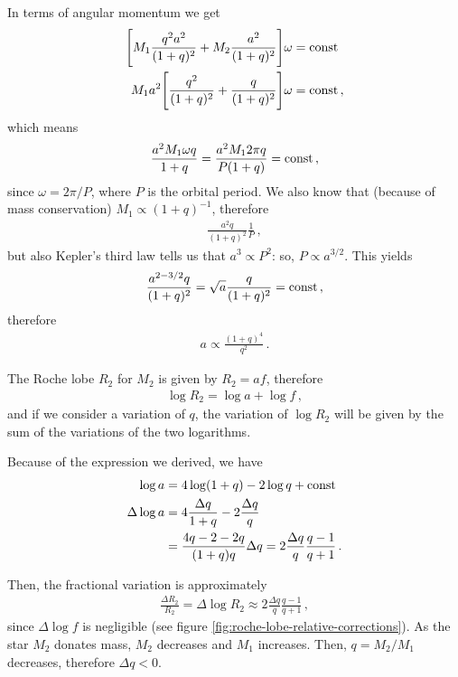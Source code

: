\documentclass[main.tex]{subfiles}
\begin{document}
In terms of angular momentum we get 
%
\begin{align}
\qty[
    M_1 \frac{q^2 a^2}{(1 + q)^2}
    + M_2 \frac{a^2}{(1+q)^2}
]\omega &= \text{const} \\
M_1 a^2
\qty[
    \frac{q^2}{(1 + q)^2}
    + \frac{q}{(1+q)^2}
]\omega &= \text{const} 
\,,
\end{align}
%
which means 
%
\begin{align}
\frac{a^2 M_1 \omega q}{1 + q} =
\frac{a^2 M_1 2 \pi  q}{P(1 + q)} 
= \text{const}
\,,
\end{align}
%
since \(\omega = 2\pi / P\), where \(P\) is the orbital period. 
We also know that (because of mass conservation) \(M_1 \propto (1 + q)^{-1}\), therefore 
%
\begin{align}
\frac{a^2 q}{(1+q)^2} \frac{1}{P}
\,,
\end{align}
%
but also Kepler's third law tells us that \(a^3 \propto P^2\): so, \(P \propto a^{3/2}\). This yields 
%
\begin{align}
\frac{a^{2 - 3/2} q}{(1+q)^2} = \sqrt{a} \frac{q}{(1+q)^2} = \text{const}
\,,
\end{align}
%
therefore 
%
\begin{align}
a \propto \frac{(1 + q)^{4}}{q^2}
\,.
\end{align}

The Roche lobe \(R_2\) for \(M_2\) is given by \(R_2 = a f\), therefore
%
\begin{align}
\log R_2 = \log a + \log f
\,,
\end{align}
%
and if we consider a variation of \(q\), the variation of \(\log R_2 \) will be given by the sum of the variations of the two logarithms. 

Because of the expression we derived, we have 
%
\begin{align}
\log a &= 4 \log (1 +q) - 2 \log q + \text{const} \\
\Delta \log a &= 4 \frac{\Delta q}{1 + q} - 2 \frac{\Delta q}{q }  \\
&= \frac{4q -2 -2 q}{(1 + q) q} \Delta q = 2 \frac{\Delta q}{q} \frac{q -1}{q +1}
\,.
\end{align}

Then, the fractional variation is approximately 
%
\begin{align}
\frac{\Delta R_2}{R_2} = \Delta \log R_2 \approx 
2\frac{\Delta q}{q} \frac{q -1}{q +1}
\,,
\end{align}
%
since \(\Delta \log f\) is negligible (see figure \ref{fig:roche-lobe-relative-corrections}). 
As the star \(M_2 \) donates mass, \(M_2 \) decreases and \(M_1 \) increases. Then, \(q = M_2 / M_1 \) decreases, therefore \(\Delta q < 0\). 
\end{document}
